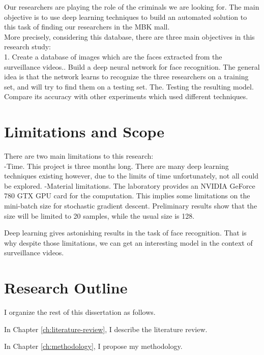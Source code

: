 Our researchers are playing the role of the criminals we are looking for.
The main objective is to use deep learning techniques to build an automated solution to this task of finding our researchers in the MBK mall.\\

More precisely, considering this database, there are three main objectives in this research study:\\
1. Create a database of images which are the faces extracted from the surveillance videos.. Build a deep neural network for face recognition. The general idea is that the network learns to recognize the three researchers on a training set, and will try to find them on a testing set. The. Testing the resulting model. Compare its accuracy with other experiments which used different techniques.

\section{Limitations and Scope}

There are two main limitations to this research:\\
-Time. This project is three months long. There are many deep learning techniques existing however, due to the limits of time unfortunately, not all could be explored.\newline
-Material limitations. The laboratory provides an NVIDIA GeForce 780 GTX GPU card for the computation. This implies some limitations on the mini-batch size for stochastic gradient descent. Preliminary results show that the size will be limited to 20 samples, while the usual size is 128.\newline

Deep learning gives astonishing results in the task of face recognition. That is why despite those limitations, we can get an interesting model in the context of surveillance videos.  

\section{Research Outline}

I organize the rest of this dissertation as follows.

In Chapter \ref{ch:literature-review}, I describe the literature review.

In Chapter \ref{ch:methodology}, I propose my methodology.



\FloatBarrier